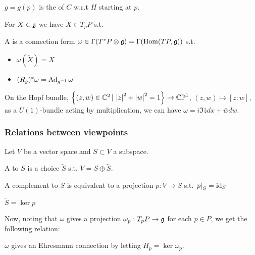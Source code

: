 \documentclass{article}
\begin{document}
\begin{definition}
$g =g(p)$ is the  of $C$ w.r.t $H$ starting at $p$.  
\end{definition}

\begin{definition}
For $X \in \mathfrak{g}$ we have $\tilde{X}\in T_pP$ s.t. 
\end{definition}

\begin{definition}
A  is a connection form $\omega \in \Gamma(T^\ast P \otimes \mathfrak{g})= \Gamma(\operatorname{Hom}(TP,\mathfrak{g}))$ s.t. 
\begin{itemize}
    \item $\omega(\tilde{X}) = X$
    \item $(R_g)^\ast \omega = \operatorname{Ad}_{g^{-1}}\omega$
\end{itemize}
\end{definition}

\begin{example}
	On the Hopf bundle, $\left\{ (z,w) \in \mathbb{C}^2 \, | \, \left\lvert z \right\rvert^2+\left\lvert w \right\rvert^2=1 \right\} \to \mathbb{CP}^1$, $(z,w) \mapsto [z:w]$, as a $U(1)$-bundle acting by multiplication, we can have $\omega = i \Im \bar{z}dx + \bar{w}dw$.
\end{example}

\subsubsection{Relations between viewpoints}
Let $V$ be a vector space and $S \subset V$ a subspace. 

\begin{definition}
A  to $S$ is a choice $\tilde{S}$ s.t. $V = S \oplus \tilde{S}$. \end{definition}

\begin{lemma}
A complement to $S$ is equivalent to a projection $p: V \to S$ s.t. $\left. p \right\rvert_{S} = \operatorname{id}_S$
\end{lemma}
\begin{corollary}
$\tilde{S}=\ker p$ 
\end{corollary}

Now, noting that $\omega$ gives a projection $\omega_p : T_pP \to \mathfrak{g}$ for each $p \in P$, we get the following relation:

\begin{prop}
$\omega$ gives an Ehresmann connection by letting $H_p = \ker \omega_p$. 
\end{prop} 
\end{document}
